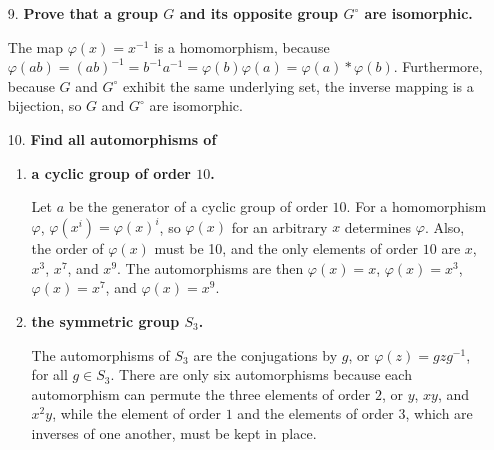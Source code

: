 \documentclass[a4paper,12pt]{article}
\begin{document}
\begin{enumerate}
    \item[9.]
        \boldmath
        \textbf{Prove that a group $G$ and its opposite group $G^\circ$ are isomorphic.} \par
        \unboldmath
        The map $\varphi(x) = x^{-1}$ is a homomorphism, because $\varphi(ab) = (ab)^{-1} = b^{-1} a^{-1} = \varphi(b) \varphi(a) = \varphi(a) * \varphi(b)$. Furthermore, because $G$ and $G^\circ$ exhibit the same underlying set, the inverse mapping is a bijection, so $G$ and $G^\circ$ are isomorphic.

    \item[10.]
        \boldmath
        \textbf{Find all automorphisms of} \par
        \unboldmath
        \begin{enumerate}
            \item
                \boldmath
                \textbf{a cyclic group of order $10$.} \par
                \unboldmath
                Let $a$ be the generator of a cyclic group of order $10$. For a homomorphism $\varphi$, $\varphi(x^i) = \varphi(x)^i$, so $\varphi(x)$ for an arbitrary $x$ determines $\varphi$. Also, the order of $\varphi(x)$ must be 10, and the only elements of order $10$ are $x$, $x^3$, $x^7$, and $x^9$. The automorphisms are then $\varphi(x) = x$, $\varphi(x) = x^3$, $\varphi(x) = x^7$, and $\varphi(x) = x^9$.
                \iffalse
                    Its automorphisms are $\varphi(x) = x$ and $\varphi(x) = \begin{cases}
                        a^{10} / x &:x \neq e \\
                        e &:x = e
                    \end{cases}.
                    $ The latter is a homomorphism because for all $x = a^m, y = a^n$,
                    \begin{align*}
                        \varphi(xy) &= \frac{a^{10}}{xy} = \frac{a^{10}}{a^{(m + n) (\text{mod }10)}} = a^{10 - (m + n) (\text{mod }10)} \\
                        &= \varphi(a^m) \varphi(a^n) = \varphi(x) \varphi(y).
                    \end{align*}
                \fi

            \item
                \boldmath
                \textbf{the symmetric group $S_3$.} \par
                \unboldmath
                The automorphisms of $S_3$ are the conjugations by $g$, or $\varphi(z) = gzg^{-1}$, for all $g \in S_3$. There are only six automorphisms because each automorphism can permute the three elements of order $2$, or $y$, $xy$, and $x^2 y$, while the element of order $1$ and the elements of order $3$, which are inverses of one another, must be kept in place.
        \end{enumerate}
\end{enumerate}
\end{document}
